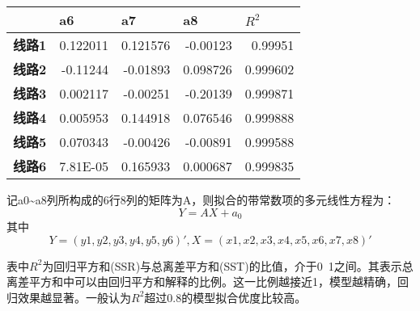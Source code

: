 \documentclass[12pt,a4paper]{ctexart}
\begin{document}
	
\begin{longtable}{@{}crrrr@{}}
	&
	\multicolumn{1}{l}{\textbf{a6}} &
	\multicolumn{1}{l}{\textbf{a7}} &
	\multicolumn{1}{l}{\textbf{a8}} &
	\multicolumn{1}{l}{\textbf{$R^2$}} \\* \cmidrule(l){2-5} 
	\endfirsthead
	\endhead
	\multicolumn{1}{c|}{\textbf{线路1}} &
	\multicolumn{1}{r|}{0.122011} &
	\multicolumn{1}{r|}{0.121576} &
	\multicolumn{1}{r|}{-0.00123} &
	\multicolumn{1}{r|}{0.99951} \\* \cmidrule(l){2-5} 
	\multicolumn{1}{c|}{\textbf{线路2}} &
	\multicolumn{1}{r|}{-0.11244} &
	\multicolumn{1}{r|}{-0.01893} &
	\multicolumn{1}{r|}{0.098726} &
	\multicolumn{1}{r|}{0.999602} \\* \cmidrule(l){2-5} 
	\multicolumn{1}{c|}{\textbf{线路3}} &
	\multicolumn{1}{r|}{0.002117} &
	\multicolumn{1}{r|}{-0.00251} &
	\multicolumn{1}{r|}{-0.20139} &
	\multicolumn{1}{r|}{0.999871} \\* \cmidrule(l){2-5} 
	\multicolumn{1}{c|}{\textbf{线路4}} &
	\multicolumn{1}{r|}{0.005953} &
	\multicolumn{1}{r|}{0.144918} &
	\multicolumn{1}{r|}{0.076546} &
	\multicolumn{1}{r|}{0.999888} \\* \cmidrule(l){2-5} 
	\multicolumn{1}{c|}{\textbf{线路5}} &
	\multicolumn{1}{r|}{0.070343} &
	\multicolumn{1}{r|}{-0.00426} &
	\multicolumn{1}{r|}{-0.00891} &
	\multicolumn{1}{r|}{0.999588} \\* \cmidrule(l){2-5} 
	\multicolumn{1}{c|}{\textbf{线路6}} &
	\multicolumn{1}{r|}{7.81E-05} &
	\multicolumn{1}{r|}{0.165933} &
	\multicolumn{1}{r|}{0.000687} &
	\multicolumn{1}{r|}{0.999835} \\* \cmidrule(l){2-5} 
\end{longtable}

	
	记a0\~{}a8列所构成的6行8列的矩阵为A，则拟合的带常数项的多元线性方程为：
	\begin{equation} 
	Y=AX+a_{0}
	\end{equation}
	其中$$Y=(y1,y2,y3,y4,y5,y6)',X=(x1,x2,x3,x4,x5,x6,x7,x8)'$$
	
	表中$R^{2}$为回归平方和(SSR)与总离差平方和(SST)的比值，介于0~1之间。其表示总离差平方和中可以由回归平方和解释的比例。这一比例越接近1，模型越精确，回归效果越显著。一般认为$R^{2}$超过0.8的模型拟合优度比较高。
	
\end{document}
